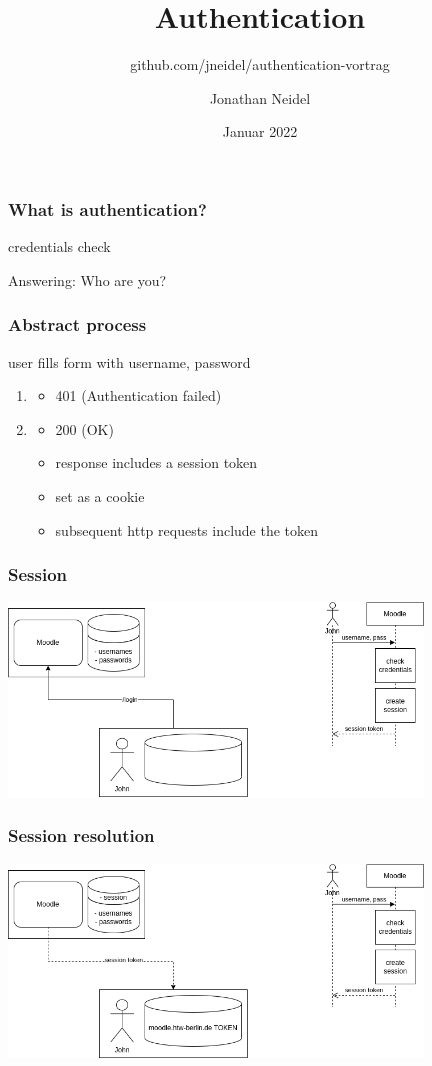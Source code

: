 \documentclass{beamer}
\title{Authentication}
\subtitle{github.com/jneidel/authentication-vortrag}
\author{Jonathan Neidel}
\date{Januar 2022}
\institute{HTW Berlin, Angewandte Informatik, Komponentenbasierte Entwicklung}
\begin{document}
\frame{\titlepage}

\begin{frame}
  \frametitle{What is authentication?}

  credentials check

  \bigskip

  Answering: Who are you?
\end{frame}

\begin{frame}
  \frametitle{Abstract process}

  user fills form with username, password
  \begin{enumerate}
    \item \begin{itemize}
      \item 401 (Authentication failed)
    \end{itemize}
    \item \begin{itemize}
      \item 200 (OK)
      \item response includes a session token
      \item set as a cookie
      \item subsequent http requests include the token
    \end{itemize}
  \end{enumerate}
\end{frame}

\begin{frame}
  \frametitle{Session}
    \includegraphics[width=11cm]{session}
\end{frame}

\begin{frame}
  \frametitle{Session resolution}
    \includegraphics[width=11cm]{session resolution}
\end{frame}
\end{document}
